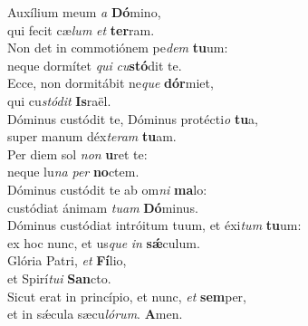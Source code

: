 \evenverse Auxílium meum \textit{a} \textbf{Dó}mino,~\*\\
\evenverse qui fecit cæ\textit{lum} \textit{et} \textbf{ter}ram.\\
\oddverse Non det in commotiónem pe\textit{dem} \textbf{tu}um:~\*\\
\oddverse neque dormítet \textit{qui} \textit{cu}\textbf{stó}dit te.\\
\evenverse Ecce, non dormitábit ne\textit{que} \textbf{dór}miet,~\*\\
\evenverse qui cu\textit{stó}\textit{dit} \textbf{Is}raël.\\
\oddverse Dóminus custódit te, Dóminus protécti\textit{o} \textbf{tu}a,~\*\\
\oddverse super manum déx\textit{te}\textit{ram} \textbf{tu}am.\\
\evenverse Per diem sol \textit{non} \textbf{u}ret te:~\*\\
\evenverse neque lu\textit{na} \textit{per} \textbf{no}ctem.\\
\oddverse Dóminus custódit te ab om\textit{ni} \textbf{ma}lo:~\*\\
\oddverse custódiat ánimam \textit{tu}\textit{am} \textbf{Dó}minus.\\
\evenverse Dóminus custódiat intróitum tuum, et éxi\textit{tum} \textbf{tu}um:~\*\\
\evenverse ex hoc nunc, et us\textit{que} \textit{in} \textbf{sǽ}culum.\\
\oddverse Glória Patri, \textit{et} \textbf{Fí}lio,~\*\\
\oddverse et Spirí\textit{tu}\textit{i} \textbf{San}cto.\\
\evenverse Sicut erat in princípio, et nunc, \textit{et} \textbf{sem}per,~\*\\
\evenverse et in sǽcula sæcu\textit{ló}\textit{rum}. \textbf{A}men.\\
